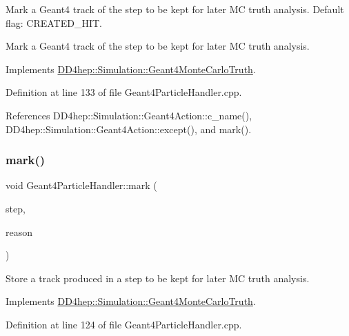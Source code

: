 Mark a Geant4 track of the step to be kept for later MC truth analysis. Default flag\+: C\+R\+E\+A\+T\+E\+D\+\_\+\+H\+IT. 

Mark a Geant4 track of the step to be kept for later MC truth analysis. 

Implements \hyperlink{class_d_d4hep_1_1_simulation_1_1_geant4_monte_carlo_truth_a6aa3674a7c9e2f0132251bf05c7dab88}{D\+D4hep\+::\+Simulation\+::\+Geant4\+Monte\+Carlo\+Truth}.



Definition at line 133 of file Geant4\+Particle\+Handler.\+cpp.



References D\+D4hep\+::\+Simulation\+::\+Geant4\+Action\+::c\+\_\+name(), D\+D4hep\+::\+Simulation\+::\+Geant4\+Action\+::except(), and mark().

\hypertarget{class_d_d4hep_1_1_simulation_1_1_geant4_particle_handler_a7a351cfb66cc4e50b9f184b2e80855f4}{}\label{class_d_d4hep_1_1_simulation_1_1_geant4_particle_handler_a7a351cfb66cc4e50b9f184b2e80855f4} 
\subsubsection{\texorpdfstring{mark()}{mark()}\hspace{0.1cm}{\footnotesize\ttfamily [4/4]}}
{\footnotesize\ttfamily void Geant4\+Particle\+Handler\+::mark (\begin{DoxyParamCaption}\item[{const G4\+Step $\ast$}]{step,  }\item[{int}]{reason }\end{DoxyParamCaption})\hspace{0.3cm}{\ttfamily [virtual]}}



Store a track produced in a step to be kept for later MC truth analysis. 



Implements \hyperlink{class_d_d4hep_1_1_simulation_1_1_geant4_monte_carlo_truth_aaa3fb07338363616c0a898d791d24314}{D\+D4hep\+::\+Simulation\+::\+Geant4\+Monte\+Carlo\+Truth}.



Definition at line 124 of file Geant4\+Particle\+Handler.\+cpp.



